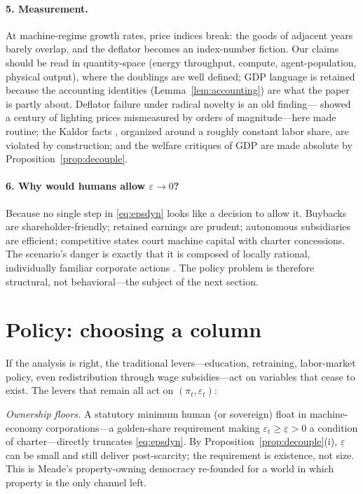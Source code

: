 \documentclass[11pt]{article}
\newcommand{\eps}{\varepsilon}
\begin{document}
\paragraph{5. Measurement.} At machine-regime growth rates, price indices break: the goods of adjacent years barely overlap, and the deflator becomes an index-number fiction. Our claims should be read in quantity-space (energy throughput, compute, agent-population, physical output), where the doublings are well defined; GDP language is retained because the accounting identities (Lemma~\ref{lem:accounting}) are what the paper is partly about. Deflator failure under radical novelty is an old finding---\citet{nordhaus1997} showed a century of lighting prices mismeasured by orders of magnitude---here made routine; the Kaldor facts \citep{kaldor1961}, organized around a roughly constant labor share, are violated by construction; and the welfare critiques of GDP \citep{stiglitz2009,coyle2014,jonesklenow2016} are made absolute by Proposition~\ref{prop:decouple}.

\paragraph{6. Why would humans allow $\eps \to 0$?} Because no single step in \eqref{eq:epsdyn} looks like a decision to allow it. Buybacks are shareholder-friendly; retained earnings are prudent; autonomous subsidiaries are efficient; competitive states court machine capital with charter concessions. The scenario's danger is exactly that it is composed of locally rational, individually familiar corporate actions \citep{kulveit2025}. The policy problem is therefore structural, not behavioral---the subject of the next section.

\section{Policy: choosing a column}\label{sec:policy}

If the analysis is right, the traditional levers---education, retraining, labor-market policy, even redistribution through wage subsidies---act on variables that cease to exist. The levers that remain all act on $(\pi_t, \eps_t)$:

\emph{Ownership floors.} A statutory minimum human (or sovereign) float in machine-economy corporations---a golden-share requirement making $\eps_t \ge \underline{\eps} > 0$ a condition of charter---directly truncates \eqref{eq:epsdyn}. By Proposition~\ref{prop:decouple}(i), $\underline{\eps}$ can be small and still deliver post-scarcity; the requirement is existence, not size. This is Meade's property-owning democracy \citep{meade1964} re-founded for a world in which property is the only channel left.
\end{document}
